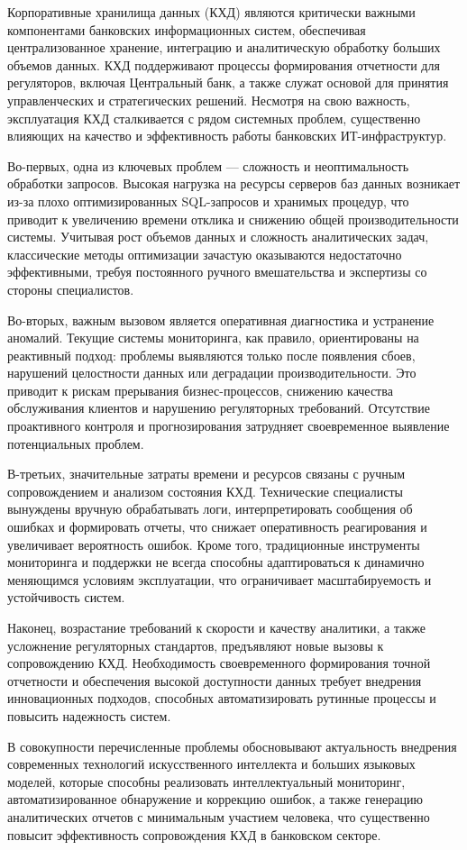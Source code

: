 \teoretic %

Корпоративные хранилища данных (КХД) являются критически важными компонентами банковских информационных систем, обеспечивая централизованное хранение, интеграцию и аналитическую обработку больших объемов данных. КХД поддерживают процессы формирования отчетности для регуляторов, включая Центральный банк, а также служат основой для принятия управленческих и стратегических решений. Несмотря на свою важность, эксплуатация КХД сталкивается с рядом системных проблем, существенно влияющих на качество и эффективность работы банковских ИТ-инфраструктур.

Во-первых, одна из ключевых проблем — сложность и неоптимальность обработки запросов. Высокая нагрузка на ресурсы серверов баз данных возникает из-за плохо оптимизированных SQL-запросов и хранимых процедур, что приводит к увеличению времени отклика и снижению общей производительности системы. Учитывая рост объемов данных и сложность аналитических задач, классические методы оптимизации зачастую оказываются недостаточно эффективными, требуя постоянного ручного вмешательства и экспертизы со стороны специалистов.

Во-вторых, важным вызовом является оперативная диагностика и устранение аномалий. Текущие системы мониторинга, как правило, ориентированы на реактивный подход: проблемы выявляются только после появления сбоев, нарушений целостности данных или деградации производительности. Это приводит к рискам прерывания бизнес-процессов, снижению качества обслуживания клиентов и нарушению регуляторных требований. Отсутствие проактивного контроля и прогнозирования затрудняет своевременное выявление потенциальных проблем.

В-третьих, значительные затраты времени и ресурсов связаны с ручным сопровождением и анализом состояния КХД. Технические специалисты вынуждены вручную обрабатывать логи, интерпретировать сообщения об ошибках и формировать отчеты, что снижает оперативность реагирования и увеличивает вероятность ошибок. Кроме того, традиционные инструменты мониторинга и поддержки не всегда способны адаптироваться к динамично меняющимся условиям эксплуатации, что ограничивает масштабируемость и устойчивость систем.

Наконец, возрастание требований к скорости и качеству аналитики, а также усложнение регуляторных стандартов, предъявляют новые вызовы к сопровождению КХД. Необходимость своевременного формирования точной отчетности и обеспечения высокой доступности данных требует внедрения инновационных подходов, способных автоматизировать рутинные процессы и повысить надежность систем.

В совокупности перечисленные проблемы обосновывают актуальность внедрения современных технологий искусственного интеллекта и больших языковых моделей, которые способны реализовать интеллектуальный мониторинг, автоматизированное обнаружение и коррекцию ошибок, а также генерацию аналитических отчетов с минимальным участием человека, что существенно повысит эффективность сопровождения КХД в банковском секторе.



